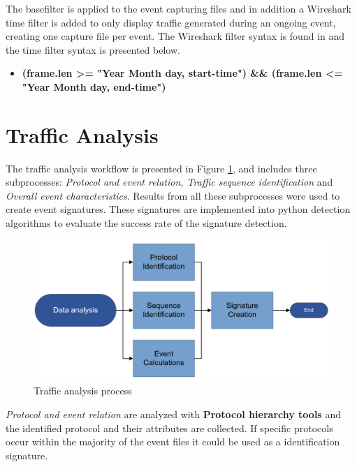 The basefilter is applied to the event capturing files and in addition a Wireshark time filter is added to only display traffic generated during an ongoing event, creating one capture file per event. The Wireshark filter syntax is found in \cite{wireshark} and the time filter syntax is presented below. 

\begin{itemize}
    \item \textbf{(frame.len >= "Year Month day, start-time") \&\& (frame.len <= "Year Month day, end-time")}
\end{itemize}



\section{Traffic Analysis}

The traffic analysis workflow is presented in Figure \ref{fig:TrafficAnalysisProcess}, and includes three subprocesses: \textit{Protocol and event relation, Traffic sequence identification} and \textit{Overall event characteristics}. Results from all these subprocesses were used to create event signatures. These signatures are implemented into python detection algorithms to evaluate the success rate of the signature detection. 

\begin{figure}[H]
    \centering
    \includegraphics[width=\textwidth]{figures/TrafficAnalysisProcess.png}
    \caption{Traffic analysis process}
    \label{fig:TrafficAnalysisProcess}
\end{figure}

\textit{Protocol and event relation} are analyzed with \textbf{Protocol hierarchy tools} and the identified protocol and their attributes are collected. If specific protocols occur within the majority of the event files it could be used as a identification signature.


